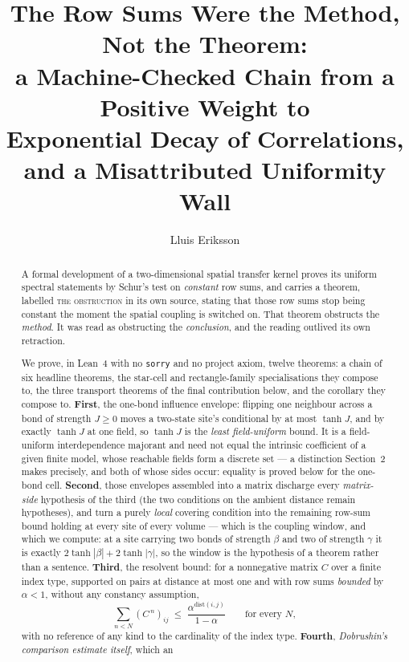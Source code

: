 \documentclass[11pt]{article}
\title{The Row Sums Were the Method, Not the Theorem:\\
a Machine-Checked Chain from a Positive Weight to\\
Exponential Decay of Correlations,\\
and a Misattributed Uniformity Wall}
\author{Lluis Eriksson}
\date{}
\theoremstyle{definition}
\newcommand{\dist}{\mathrm{dist}}
\begin{document}
\maketitle

\begin{abstract}
A formal development of a two-dimensional spatial transfer kernel proves its
uniform spectral statements by Schur's test on \emph{constant} row sums, and
carries a theorem, labelled \textsc{the obstruction} in its own source, stating
that those row sums stop being constant the moment the spatial coupling is
switched on.  That theorem obstructs the \emph{method}.  It was read as
obstructing the \emph{conclusion}, and the reading outlived its own retraction.

We prove, in Lean~4 with no \texttt{sorry} and no project axiom, twelve
theorems: a chain of
six headline theorems, the star-cell and rectangle-family
specialisations they compose to, the three transport theorems of the
final contribution below, and the corollary they compose to.  \textbf{First}, the one-bond influence envelope: flipping one
neighbour across a bond of strength $J\ge0$ moves a two-state site's conditional
by at most $\tanh J$, and by exactly $\tanh J$ at one field, so $\tanh J$ is the
\emph{least field-uniform} bound.  It is a field-uniform interdependence
majorant and need not equal the intrinsic coefficient of a given finite
model, whose reachable fields form
a discrete set --- a distinction Section~2 makes precisely, and both of whose
sides occur: equality is proved below for the one-bond cell.  \textbf{Second},
those envelopes assembled into a matrix discharge every \emph{matrix-side}
hypothesis of the third (the two conditions on the ambient distance remain
hypotheses), and turn a purely \emph{local} covering condition into the
remaining row-sum bound holding at every site of every volume --- which is the
coupling window, and which we compute: at a site carrying two bonds of strength
$\beta$ and two of strength $\gamma$ it is exactly
$2\tanh|\beta|+2\tanh|\gamma|$, so the window is the hypothesis of a theorem
rather than a sentence.  \textbf{Third}, the
resolvent bound: for a nonnegative matrix $C$ over a finite index type, supported
on pairs at distance at most one and with row sums \emph{bounded} by $\alpha<1$,
without any constancy assumption,
\[
  \sum_{n<N}(C^{\,n})_{ij}\;\le\;\frac{\alpha^{\dist(i,j)}}{1-\alpha}
  \qquad\text{for every }N,
\]
with no reference of any kind to the cardinality of the index type.
\textbf{Fourth}, \emph{Dobrushin's comparison estimate itself}, which an

\end{abstract}
\end{document}
